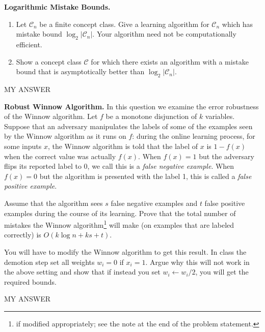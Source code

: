 \documentclass[11pt]{article}
\newcommand*{\C}{{\mathcal C}}
\DeclareMathOperator{\1}{\mathbbm{1}}
\begin{document}
\begin{problem} [10pts] \textbf{Logarithmic Mistake Bounds.} \quad
	\begin{enumerate}[label=\alph*)]
		\item Let $\C_n$ be a finite concept class.  Give a learning
		algorithm for $\C_n$ which has mistake bound $\log_2|\C_n|.$  Your algorithm
		need not be computationally efficient.
		\item Show a concept class $\C$ for which there exists an algorithm with a mistake bound that is asymptotically better than $\log_2|\C_n|$.
	\end{enumerate}

MY ANSWER
\end{problem}

\begin{problem}[15 points] \textbf{Robust Winnow Algorithm.}
	In this question we examine the error robustness of the Winnow algorithm. Let $f$ be a monotone disjunction of $k$ variables. Suppose that an adversary manipulates the labels of some of the examples seen by the Winnow algorithm as it runs on $f$: during the online learning process, for some inputs $x$, the Winnow algorithm is told that the label of $x$ is $1-f(x)$ when the correct value was actually $f(x)$. When $f(x) = 1$ but the adversary flips its reported label to 0, we call this is a \emph{false negative example}. When $f(x) = 0$ but the algorithm is presented with the label 1, this is called a \emph{false positive example}.
	
Assume that the algorithm sees $s$ false negative examples and $t$ false positive examples during the course of its learning. Prove that the total number of mistakes the Winnow algorithm\footnote{if modified appropriately; see the note at the end of the problem statement.} will make (on examples that are labeled correctly) is $O(k \log{n} + ks + t)$.
\end{problem}
\begin{note}
	You will have to modify the Winnow algorithm to get this result. In class
	the demotion step set all weights $w_i = 0$ if $x_i = 1$. Argue why this will
	not work in the above setting and show that if instead you set $w_i \leftarrow
	w_i/2$, you will get the required bounds.
\end{note}

MY ANSWER
\end{document}
